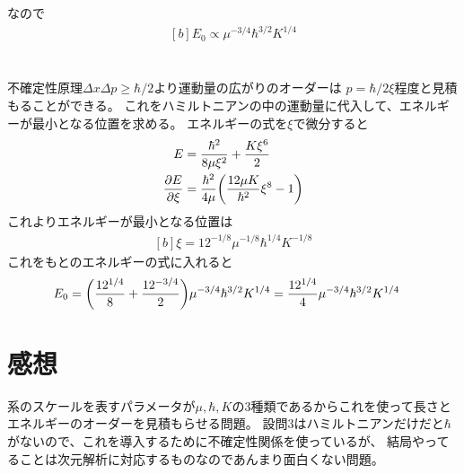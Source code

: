 \documentclass[../ap_2009.tex]{subfiles}
\begin{document}
なので
\begin{equation}\begin{aligned}[b]
    E_0 \propto \mu^{-3/4}\hbar^{3/2}K^{1/4}
\end{aligned}\end{equation}

\section{}
不確定性原理\(\Delta x\Delta p \geq \hbar/2\)より運動量の広がりのオーダーは
\(p=\hbar/2\xi\)程度と見積もることができる。
これをハミルトニアンの中の運動量に代入して、エネルギーが最小となる位置を求める。
エネルギーの式を\(\xi\)で微分すると
\begin{equation}\begin{aligned}[b]
    E &= \frac{\hbar^2}{8\mu\xi^2}+\frac{K\xi^6}{2}\\
    \pdv{E}{\xi} &= \frac{\hbar^2}{4\mu}\qty(\frac{12\mu K}{\hbar^2}\xi^8-1)
\end{aligned}\end{equation}
これよりエネルギーが最小となる位置は
\begin{equation}\begin{aligned}[b]
    \xi = 12^{-1/8}\mu^{-1/8}\hbar^{1/4}K^{-1/8}
\end{aligned}\end{equation}
これをもとのエネルギーの式に入れると
\begin{equation}\begin{aligned}[b]
    E_0 &= \qty(\frac{12^{1/4}}{8}+\frac{12^{-3/4}}{2})\mu^{-3/4}\hbar^{3/2}K^{1/4}
    =\frac{12^{1/4}}{4}\mu^{-3/4}\hbar^{3/2}K^{1/4}
\end{aligned}\end{equation}

\section*{感想}
系のスケールを表すパラメータが\(\mu,\hbar,K\)の3種類であるからこれを使って長さとエネルギーのオーダーを見積もらせる問題。
設問3はハミルトニアンだけだと\(\hbar\)がないので、これを導入するために不確定性関係を使っているが、
結局やってることは次元解析に対応するものなのであんまり面白くない問題。
\end{document}

